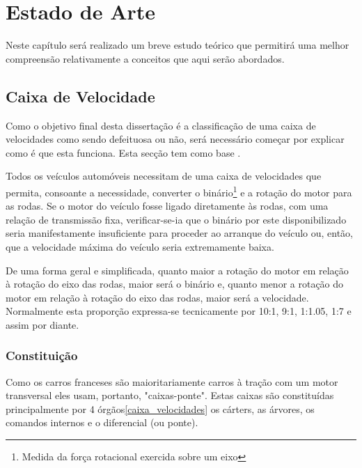 
\chapter{Estado de Arte}
\label{chapter:Estado de Arte}

\begin{Estado de Arte}

Neste capítulo será realizado um breve estudo teórico que permitirá uma melhor compreensão relativamente a conceitos que aqui serão abordados.

\end{Estado de Arte}

\section{Caixa de Velocidade}
Como o objetivo final desta dissertação é a classificação de uma caixa de velocidades como sendo defeituosa ou não, será necessário começar por explicar como é que esta funciona. Esta secção tem como base \textcite{formacaoCaixa}.

Todos os veículos automóveis necessitam de uma caixa de velocidades que permita, consoante a necessidade, converter o binário\footnote{Medida da força rotacional exercida sobre um eixo} e a rotação do motor para as rodas.
Se o motor do veículo fosse ligado diretamente às rodas, com uma relação de transmissão fixa, verificar-se-ia que o binário por este disponibilizado seria manifestamente insuficiente para proceder ao arranque do veículo ou, então, que a velocidade máxima do veículo seria extremamente baixa.

De uma forma geral e simplificada, quanto maior a rotação do motor em relação à rotação do eixo das rodas, maior será o binário e, quanto menor a rotação do motor em relação à rotação do eixo das rodas, maior será a velocidade. Normalmente esta proporção expressa-se tecnicamente por 10:1, 9:1, 1:1.05, 1:7 e assim por diante.

\subsection{Constituição}

Como os carros franceses são maioritariamente carros à tração com um motor transversal eles usam, portanto, "caixas-ponte".
Estas caixas são constituídas principalmente por 4 órgãos\ref{caixa_velocidades} os cárters, as árvores, os comandos internos e o diferencial (ou ponte).

